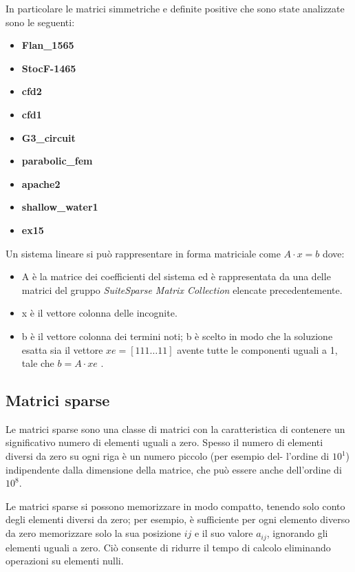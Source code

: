 \documentclass[preprint,12pt]{elsarticle}
\begin{document}
In particolare le matrici simmetriche e definite positive che sono state analizzate sono le seguenti:
\begin{center}
	\begin{itemize}
		\item \textbf{Flan\_1565}
		\item \textbf{StocF-1465}
		\item \textbf{cfd2}
		\item \textbf{cfd1}
		\item \textbf{G3\_circuit}
		\item \textbf{parabolic\_fem}
		\item \textbf{apache2}
		\item \textbf{shallow\_water1}
		\item \textbf{ex15}
	\end{itemize}
	
\end{center}

Un sistema lineare si può rappresentare in forma matriciale come $ A \cdot x = b $
dove:
\begin{itemize}
	\item A è la matrice dei coefficienti del sistema ed è rappresentata da una delle matrici del gruppo \textit{SuiteSparse Matrix Collection} elencate precedentemente.
	\item x è il vettore colonna delle incognite.
	\item b è il vettore colonna dei termini noti; b è scelto in modo che la soluzione esatta sia il vettore $ xe = [1 1 1 \dots 1 1] $ avente tutte le componenti uguali a 1, tale che $ b = A \cdot xe $ .
\end{itemize}


\subsection{Matrici sparse}
Le matrici sparse sono una classe di matrici con la caratteristica di contenere un significativo numero di elementi uguali a zero. Spesso il numero di elementi diversi da zero su ogni riga è un numero piccolo (per esempio del- l’ordine di $10^1$) indipendente dalla dimensione della matrice, che può essere anche dell’ordine di $10^8$.

Le matrici sparse si possono memorizzare in modo compatto, tenendo solo conto degli elementi diversi da zero; per esempio, è sufficiente per ogni elemento diverso da zero memorizzare solo la sua posizione $i j$ e il suo valore $a_{ij}$, ignorando gli elementi uguali a zero. Ciò consente di ridurre il tempo di calcolo eliminando operazioni su elementi nulli.
\end{document}
